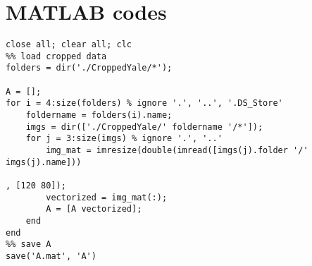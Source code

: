 \documentclass[12pt,a4paper]{article}
\begin{document}
\appendix
\section{MATLAB codes}
\begin{verbatim}
close all; clear all; clc
%% load cropped data
folders = dir('./CroppedYale/*');

A = [];
for i = 4:size(folders) % ignore '.', '..', '.DS_Store'
    foldername = folders(i).name;
    imgs = dir(['./CroppedYale/' foldername '/*']); 
    for j = 3:size(imgs) % ignore '.', '..'
        img_mat = imresize(double(imread([imgs(j).folder '/' imgs(j).name]))
                                                                                             , [120 80]);
        vectorized = img_mat(:);
        A = [A vectorized];
    end
end
%% save A
save('A.mat', 'A')


\end{verbatim}
\end{document}
